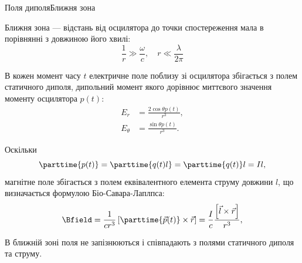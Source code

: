 \documentclass[9pt]{beamer}
\let\vect\vec
\begin{document}
\begin{frame}{Поля диполя}{Ближня зона}
	\begin{block}{}
		Ближня зона --- відстань від осцилятора до точки спостереження  мала в порівнянні з
		довжиною його хвилі:
		\begin{equation*}
			\frac1r \gg \frac{\omega}c, \quad	r \ll \frac{\lambda}{2\pi}
		\end{equation*}
	\end{block}

	\begin{overprint}
		\begin{block}{}
			В кожен момент часу $ t $ електричне поле поблизу
			зі осцилятора збігається з полем статичного диполя, дипольний момент якого дорівнює миттєвого значення моменту осцилятора $  p(t) $:
			\begin{align*}
				E_r        & = \frac{2\cos\theta p(t)}{r^3},  \\
				E_{\theta} & =  \frac{\sin\theta p(t)}{r^3} .
			\end{align*}
		\end{block}
		\begin{block}{}
			Оскільки
			\begin{equation*}
				\parttime{p(t)} = \parttime{q(t)l} = \parttime{q(t)}l = I l,
			\end{equation*}
			магнітне поле збігається з полем еквівалентного елемента струму довжини $ l $, що визначається формулою Біо-Савара-Лаплпса:
			\begin{equation*}
				\Bfield   = \frac{1}{cr^3} \left[ \parttime{\vect{p}(t)}\times\vect{r}\right] = \frac{I}{c} \frac{\left[ \vect{l}\times\vect{r}\right] }{r^3},
			\end{equation*}
		\end{block}
		\begin{alertblock}{}
			В ближній зоні поля не запізнюються і співпадають з полями статичного диполя та струму.
		\end{alertblock}
	\end{overprint}
\end{frame}
\end{document}
